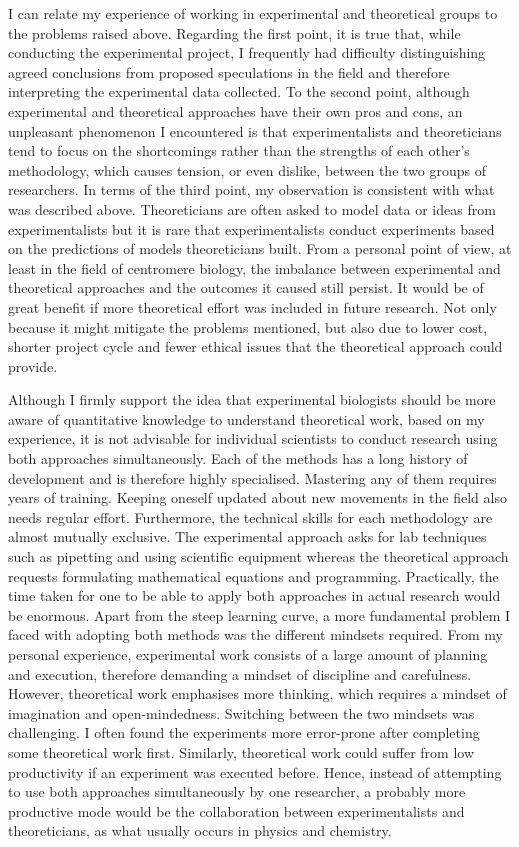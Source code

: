 I can relate my experience of working in experimental and theoretical groups to the problems \cite{Fidelman1985TheModeling} raised above. Regarding the first point, it is true that, while conducting the experimental project, I frequently had difficulty distinguishing agreed conclusions from proposed speculations in the field and therefore interpreting the experimental data collected. To the second point, although experimental and theoretical approaches have their own pros and cons, an unpleasant phenomenon I encountered is that experimentalists and theoreticians tend to focus on the shortcomings rather than the strengths of each other's methodology, which causes tension, or even dislike, between the two groups of researchers. In terms of the third point, my observation is consistent with what was described above. Theoreticians are often asked to model data or ideas from experimentalists but it is rare that experimentalists conduct experiments based on the predictions of models theoreticians built. From a personal point of view, at least in the field of centromere biology, the imbalance between experimental and theoretical approaches and the outcomes it caused still persist. It would be of great benefit if more theoretical effort was included in future research. Not only because it might mitigate the problems mentioned, but also due to lower cost, shorter project cycle and fewer ethical issues that the theoretical approach could provide. 

Although I firmly support the idea that experimental biologists should be more aware of quantitative knowledge to understand theoretical work, based on my experience, it is not advisable for individual scientists to conduct research using both approaches simultaneously. Each of the methods has a long history of development and is therefore highly specialised. Mastering any of them requires years of training. Keeping oneself updated about new movements in the field also needs regular effort. Furthermore, the technical skills for each methodology are almost mutually exclusive. The experimental approach asks for lab techniques such as pipetting and using scientific equipment whereas the theoretical approach requests formulating mathematical equations and programming. Practically, the time taken for one to be able to apply both approaches in actual research would be enormous. Apart from the steep learning curve, a more fundamental problem I faced with adopting both methods was the different mindsets required. From my personal experience, experimental work consists of a large amount of planning and execution, therefore demanding a mindset of discipline and carefulness. However, theoretical work emphasises more thinking, which requires a mindset of imagination and open-mindedness. Switching between the two mindsets was challenging. I often found the experiments more error-prone after completing some theoretical work first. Similarly, theoretical work could suffer from low productivity if an experiment was executed before. Hence, instead of attempting to use both approaches simultaneously by one researcher, a probably more productive mode would be the collaboration between experimentalists and theoreticians, as what usually occurs in physics and chemistry. 
